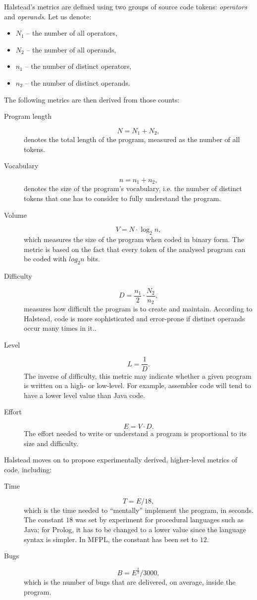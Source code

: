\documentclass[11pt,a4paper,twoside]{article}
\begin{document}
\begin{multicols}{2}
Halstead's metrics are defined using two groups of source code tokens:
\emph{operators} and \emph{operands}. Let us denote:
\begin{itemize}
\item $N_1$ -- the number of all operators, 
\item $N_2$ -- the number of all operands, 
\item $n_1$ -- the number of distinct operators, 
\item $n_2$ -- the number of distinct operands.
\end{itemize}

The following metrics are then derived from those counts:
\begin{description}
\item[Program length]
  $$N = N_1 + N_2,$$ denotes the total length of the program, measured
  as the number of all tokens.
\item[Vocabulary]
  $$n = n_1 + n_2,$$ denotes the size of the program's vocabulary,
  i.e.  the number of distinct tokens that one has to consider to
  fully understand the program.
\item[Volume]
  $$V = N \cdot \log_2n,$$ which measures the size of the program when
  coded in binary form. The metric is based on the fact that every
  token of the analysed program can be coded with $log_2n$ bits.
\item[Difficulty]
  $$D = \frac{n_1}{2}\cdot\frac{N_2}{n_2},$$ measures how difficult
  the program is to create and maintain. According to Halstead, code
  is more sophisticated and error-prone if distinct operands occur
  many times in it..
\item[Level]
  $$L = \frac{1}{D}.$$ The inverse of difficulty, this metric may
  indicate whether a given program is written on a high- or
  low-level. For example, assembler code will tend to have a lower
  level value than Java code.
\item[Effort]
  $$E = V \cdot D.$$ The effort needed to write or understand a
  program is proportional to its size and difficulty.
\end{description}

Halstead moves on to propose experimentally derived, higher-level
metrics of code, including:
\begin{description}
\item[Time]
$$T = E/18,$$ which is the time needed to ``mentally'' implement the
  program, in seconds. The constant $18$ was set by experiment for
  procedural languages such as Java; for Prolog, it has to be changed
  to a lower value since the language syntax is simpler. In MFPL, 
  the constant has been set to $12$.
\item[Bugs]
$$B = E^{\frac{2}{3}}/3000,$$ which is the number of bugs that are
  delivered, on average, inside the program.
\end{description}


\end{multicols}
\end{document}
